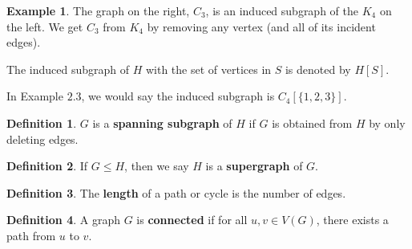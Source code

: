 \documentclass[12pt]{article}
\theoremstyle{definition}
\newtheorem{defn}{Definition}[section]
\newtheorem{ex}{Example}[section]
\begin{document}
\begin{graybox}
    \begin{ex}
    The graph on the right, $C_3$, is an induced subgraph of the $K_4$ on the left. We get $C_3$ from $K_4$ by removing any vertex (and all of its incident edges).
    \center
\hspace{32pt}
    \end{ex}
\end{graybox}

The induced subgraph of $H$ with the set of vertices in $S$ is denoted by $H[S]$.

In Example $2.3$, we would say the induced subgraph is $C_4[\{1,2,3\}]$.

\begin{bluebox}
    \begin{defn}
        $G$ is a \textbf{spanning subgraph} of $H$ if $G$ is obtained from $H$ by only deleting edges.
    \end{defn}
\end{bluebox}

\begin{bluebox}
    \begin{defn}
        If $ G \leq H$, then we say $H$ is a \textbf{supergraph} of $G$.
    \end{defn}
\end{bluebox}

\begin{bluebox}
    \begin{defn}
    The \textbf{length} of a path or cycle is the number of edges.
\end{defn}
\end{bluebox}

\begin{bluebox}
    \begin{defn}
        A graph $G$ is \textbf{connected} if for all $u,v \in V(G)$, there exists a path from $u$ to $v$.
    \end{defn}
\end{bluebox}
\end{document}
